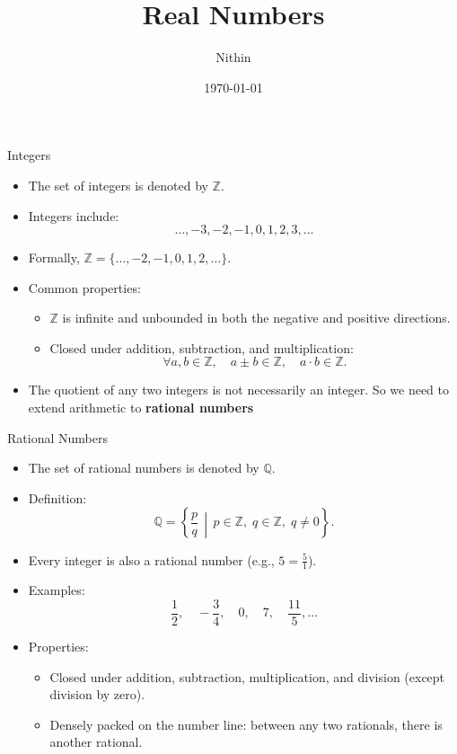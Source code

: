 \documentclass{beamer}
\title{Real Numbers}
\author{Nithin}
\institute{Maveric Systems}
\date{\today}
\begin{document}
\frame{\titlepage}

\begin{frame}{Integers}
    \begin{itemize}
        \item The set of integers is denoted by \(\mathbb{Z}\).
        \item Integers include:
        \[
          \ldots, -3, -2, -1, 0, 1, 2, 3, \ldots
        \]
        \item Formally, \(\mathbb{Z} = \{\dots, -2, -1, 0, 1, 2, \dots\}\).
        \item Common properties:
        \begin{itemize}
            \item \(\mathbb{Z}\) is infinite and unbounded in both the negative and positive directions.
            \item Closed under addition, subtraction, and multiplication:
                \[
                  \forall a, b \in \mathbb{Z}, \quad
                  a \pm b \in \mathbb{Z}, \quad
                  a \cdot b \in \mathbb{Z}.
                \]
        \end{itemize}
        \item The quotient of any two integers is not necessarily an integer. So we need to extend arithmetic to \textbf{rational numbers}
    \end{itemize}
\end{frame}

\begin{frame}{Rational Numbers}
    \begin{itemize}
        \item The set of rational numbers is denoted by \(\mathbb{Q}\).
        \item Definition:
        \[
          \mathbb{Q} = \left\{ \frac{p}{q} \,\middle|\,
            p \in \mathbb{Z}, \; q \in \mathbb{Z}, \; q \neq 0
          \right\}.
        \]
        \item Every integer is also a rational number (e.g., \(5 = \frac{5}{1}\)).
        \item Examples:
        \[
          \frac{1}{2}, \quad -\frac{3}{4}, \quad 0, \quad 7, \quad \frac{11}{5}, \ldots
        \]
        \item Properties:
        \begin{itemize}
            \item Closed under addition, subtraction, multiplication, and division (except division by zero).
            \item Densely packed on the number line: between any two rationals, there is another rational.
        \end{itemize}
    \end{itemize}
\end{frame}
\end{document}
